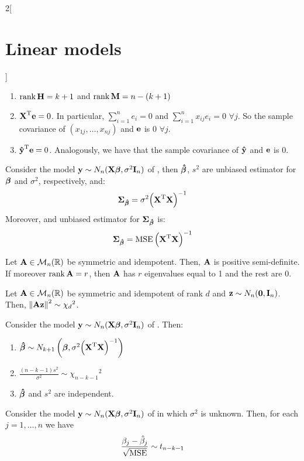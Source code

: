 \documentclass[../../../main_math.tex]{subfiles}
\begin{document}
\begin{multicols}{2}[\section{Linear models}]
\begin{proposition}
\begin{enumerate}
      \item $\rank \boldsymbol{\mathrm{H}}=k+1$ and $\rank \boldsymbol{\mathrm{M}}=n-(k+1)$
      \item ${\boldsymbol{\mathrm{X}}}^{\mathrm{T}}\boldsymbol{\mathrm{e}}=0$. In particular, $\sum_{i=1}^n e_i=0$ and $\sum_{i=1}^n x_{ij}e_i=0$ $\forall j$. So the sample covariance of $(x_{1j},\ldots,x_{nj})$ and $\boldsymbol{\mathrm{e}}$ is 0 $\forall j$.
      \item ${\boldsymbol{\mathrm{\hat{y}}}}^{\mathrm{T}}\boldsymbol{\mathrm{e}}=0$. Analogously, we have that the sample covariance of $\boldsymbol{\mathrm{\hat{y}}}$ and $\boldsymbol{\mathrm{e}}$ is 0.
    \end{enumerate}
  \end{proposition}
  \begin{proposition}
    Consider the model $\boldsymbol{\mathrm{y}}\sim N_n(\boldsymbol{\mathrm{X\beta}},\sigma^2\boldsymbol{\mathrm{I}}_n)$ of , then $\boldsymbol{\mathrm{\hat\beta}}$, $s^2$ are unbiased estimator for $\boldsymbol{\mathrm{\beta}}$ and $\sigma^2$, respectively, and: $$\boldsymbol{\mathrm{\Sigma}}_{\boldsymbol{\mathrm{\hat\beta}}}=\sigma^2{\left({\boldsymbol{\mathrm{X}}}^{\mathrm{T}}\boldsymbol{\mathrm{X}}\right)}^{-1}$$
    Moreover, and unbiased estimator for $\boldsymbol{\mathrm{\Sigma}}_{\boldsymbol{\mathrm{\hat\beta}}}$ is: $$\boldsymbol{\mathrm{\Sigma}}_{\boldsymbol{\mathrm{\hat\beta}}}=\operatorname{MSE}{\left({\boldsymbol{\mathrm{X}}}^{\mathrm{T}}\boldsymbol{\mathrm{X}}\right)}^{-1}$$
  \end{proposition}
  \begin{proposition}
    Let $\boldsymbol{\mathrm{A}}\in\mathcal{M}_n(\mathbb{R})$ be symmetric and idempotent. Then, $\boldsymbol{\mathrm{A}}$ is positive semi-definite. If moreover $\rank\boldsymbol{\mathrm{A}} =r$, then $\boldsymbol{\mathrm{A}}$ has $r$ eigenvalues equal to 1 and the rest are 0.
  \end{proposition}
  \begin{lemma}
    Let $\boldsymbol{\mathrm{A}}\in\mathcal{M}_n(\mathbb{R})$ be symmetric and idempotent of rank $d$ and $\boldsymbol{\mathrm{z}}\sim N_n(\boldsymbol{\mathrm{0}},\boldsymbol{\mathrm{I}}_n)$. Then, $\left\|\boldsymbol{\mathrm{Az}}\right\|^2\sim{\chi_d}^2$.
  \end{lemma}
  \begin{proposition}
    Consider the model $\boldsymbol{\mathrm{y}}\sim N_n(\boldsymbol{\mathrm{X\beta}},\sigma^2\boldsymbol{\mathrm{I}}_n)$ of . Then:
    \begin{enumerate}
      \item $\boldsymbol{\mathrm{\hat\beta}}\sim N_{k+1}\left(\boldsymbol{\mathrm{\beta}},\sigma^2{\left({\boldsymbol{\mathrm{X}}}^{\mathrm{T}}\boldsymbol{\mathrm{X}}\right)}^{-1}\right)$
      \item $\frac{(n-k-1)s^2}{\sigma^2}\sim{\chi_{n-k-1}}^2$
      \item $\boldsymbol{\mathrm{\hat\beta}}$ and $s^2$ are independent.
    \end{enumerate}
  \end{proposition}
  \begin{proposition}
    Consider the model $\boldsymbol{\mathrm{y}}\sim N_n(\boldsymbol{\mathrm{X\beta}},\sigma^2\boldsymbol{\mathrm{I}}_n)$ of  in which $\sigma^2$ is unknown. Then, for each $j=1,\ldots,n$ we have $$\frac{\beta_j-\hat\beta_j}{\sqrt{\operatorname{MSE}}}\sim t_{n-k-1}$$

\end{proposition}
\end{multicols}
\end{document}
